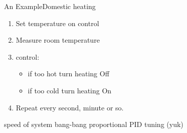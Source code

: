 \documentclass[xcolor=svgnames]{beamer}
\begin{document}
\begin{frame}{An Example}{Domestic heating }
\begin{enumerate}
    \item Set temperature on control
    \item Measure room temperature
    \item control:
    \begin{itemize}
        \item if too hot turn heating Off
        \item if too cold turn heating On
    \end{itemize}
    \item Repeat every second, minute or so.
\end{enumerate}
\end{frame}

\begin{frame}{}
\end{frame}

speed of system
bang-bang
proportional
PID
tuning (yuk)
\end{document}
